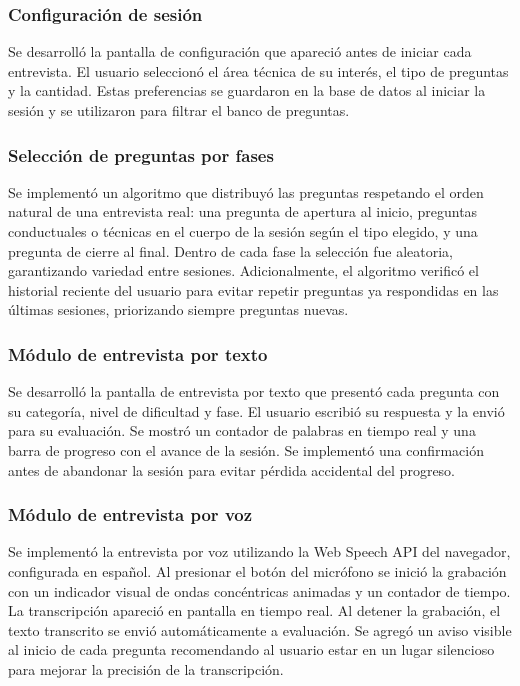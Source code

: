 \subsubsection{Configuración de sesión}

Se desarrolló la pantalla de configuración que apareció antes de
iniciar cada entrevista. El usuario seleccionó el área técnica de
su interés, el tipo de preguntas y la cantidad. Estas preferencias
se guardaron en la base de datos al iniciar la sesión y se utilizaron
para filtrar el banco de preguntas.

\subsubsection{Selección de preguntas por fases}

Se implementó un algoritmo que distribuyó las preguntas respetando
el orden natural de una entrevista real: una pregunta de apertura
al inicio, preguntas conductuales o técnicas en el cuerpo de la
sesión según el tipo elegido, y una pregunta de cierre al final.
Dentro de cada fase la selección fue aleatoria, garantizando variedad
entre sesiones. Adicionalmente, el algoritmo verificó el historial
reciente del usuario para evitar repetir preguntas ya respondidas
en las últimas sesiones, priorizando siempre preguntas nuevas.

\subsubsection{Módulo de entrevista por texto}

Se desarrolló la pantalla de entrevista por texto que presentó cada
pregunta con su categoría, nivel de dificultad y fase. El usuario
escribió su respuesta y la envió para su evaluación. Se mostró un
contador de palabras en tiempo real y una barra de progreso con el
avance de la sesión. Se implementó una confirmación antes de
abandonar la sesión para evitar pérdida accidental del progreso.

\subsubsection{Módulo de entrevista por voz}

Se implementó la entrevista por voz utilizando la Web Speech API
del navegador, configurada en español. Al presionar el botón del
micrófono se inició la grabación con un indicador visual de ondas
concéntricas animadas y un contador de tiempo. La transcripción
apareció en pantalla en tiempo real. Al detener la grabación, el
texto transcrito se envió automáticamente a evaluación. Se agregó
un aviso visible al inicio de cada pregunta recomendando al usuario
estar en un lugar silencioso para mejorar la precisión de la
transcripción.

